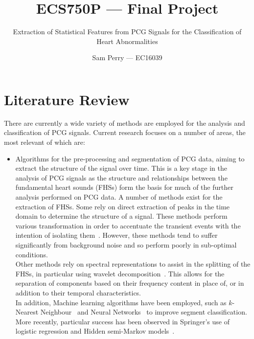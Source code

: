 \documentclass[titlepage]{scrartcl}
\begin{document}
\title{ECS750P --- Final Project}
\subtitle{\LARGE{Extraction of Statistical Features from PCG Signals for the
Classification of Heart Abnormalities}}

\author{Sam Perry --- EC16039}

\maketitle

\section{Literature Review}
There are currently a wide variety of methods are employed for the analysis and
classification of PCG signals. Current research focuses on a number of areas,
the most relevant of which are:
\begin{itemize}
    \item Algorithms for the pre-processing and segmentation of PCG data,
        aiming to extract the structure of the signal over time. This is a key
        stage in the analysis of PCG signals as the structure and relationships between the
        fundamental heart sounds (FHSs) form the basis for much of the further
        analysis performed on PCG data. A number of methods exist for the
        extraction of FHSs. Some rely on direct extraction of peaks in the time
        domain to determine the structure of a signal. These methods perform
        various transformation in order to accentuate the transient events with
        the intention of isolating them~\parencite{Groch1992, Liang1997}.
        However, these methods tend to suffer significantly from background
        noise and so perform poorly in sub-optimal conditions.\\ 
        Other methods rely on spectral representations to assist in the
        splitting of the FHSs, in particular using wavelet
        decomposition~\parencite{LiangHuiying1997, Vepa2008}. This allows for
        the separation of components based on their frequency content in place
        of, or in addition to their temporal characteristics.\\
        In addition, Machine learning algorithms have been employed, such as
        $k$-Nearest Neighbour~\parencite{Gupta2007} and Neural
        Networks~\parencite{Oskiper2002} to improve segment classification.
        More recently, particular success has been observed in Springer's use
        of logistic regression and Hidden semi-Markov
        models~\citeyearpar{Springer2016}.


\end{itemize}
\end{document}
